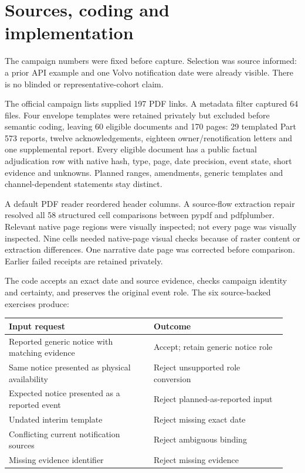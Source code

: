\documentclass[11pt,letterpaper]{article}
\newcommand{\DocumentCount}{60}
\newcommand{\PageCount}{170}
\newcommand{\PlanCount}{29}
\begin{document}
\section*{Sources, coding and implementation}
The campaign numbers were fixed before capture. Selection was source informed: a prior API example and one Volvo notification date were already visible. There is no blinded or representative-cohort claim.

The official campaign lists supplied 197 PDF links. A metadata filter captured 64 files. Four envelope templates were retained privately but excluded before semantic coding, leaving \DocumentCount{} eligible documents and \PageCount{} pages: \PlanCount{} templated Part 573 reports, twelve acknowledgements, eighteen owner/renotification letters and one supplemental report. Every eligible document has a public factual adjudication row with native hash, type, page, date precision, event state, short evidence and unknowns. Planned ranges, amendments, generic templates and channel-dependent statements stay distinct.

A default PDF reader reordered header columns. A source-flow extraction repair resolved all 58 structured cell comparisons between pypdf and pdfplumber. Relevant native page regions were visually inspected; not every page was visually inspected. Nine cells needed native-page visual checks because of raster content or extraction differences. One narrative date page was corrected before comparison. Earlier failed receipts are retained privately.

The code accepts an exact date and source evidence, checks campaign identity and certainty, and preserves the original event role. The six source-backed exercises produce:

\small
\begin{tabular}{@{}p{0.49\linewidth}p{0.45\linewidth}@{}}
\toprule
Input request & Outcome\\
\midrule
Reported generic notice with matching evidence & Accept; retain generic notice role\\
Same notice presented as physical availability & Reject unsupported role conversion\\
Expected notice presented as a reported event & Reject planned-as-reported input\\
Undated interim template & Reject missing exact date\\
Conflicting current notification sources & Reject ambiguous binding\\
Missing evidence identifier & Reject missing evidence\\
\bottomrule
\end{tabular}
\normalsize
\end{document}
